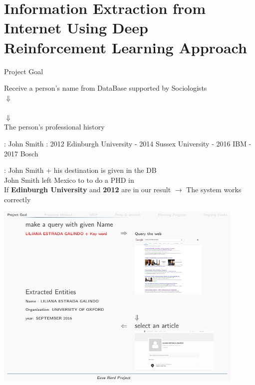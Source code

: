 \documentclass{beamer}
\newcommand{\remark}[1]{{\color{blue}{#1}}}
\newcommand{\PA}[1]{{\color{mygreen}{#1}}}
\begin{document}
\section{Information Extraction from Internet Using Deep Reinforcement Learning Approach}
\begin{frame}{Project Goal}
\begin{center}
Receive a person's name from DataBase supported by Sociologists \\
	$\Downarrow$\\
		\\
	$\Downarrow$\\
	The person's professional history
\end{center}
\PA{Example}: John Smith : 2012 Edinburgh University - 2014 Sussex University - 2016 IBM - 2017 Bosch

\PA{How to test the system}: John Smith + his destination is given in the DB \\
John Smith left Mexico to \remark{Edinburgh University 2012} to do a PHD
in \remark{Computer Vision}\\
\vspace{0.5cm}
If \textbf{Edinburgh University} and \textbf{2012} are in our result $\longrightarrow$ The system
works correctly

\end{frame}

\begin{frame}
\begin{center}
	\includegraphics[width=12cm]{iimas/query.pdf}
\end{center}
\end{frame}
\end{document}
